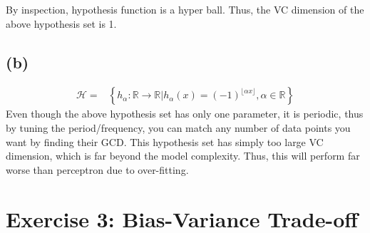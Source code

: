 \documentclass[11pt]{article}
\begin{document}
By inspection, hypothesis function is a hyper ball. Thus, the VC dimension of the above hypothesis set is 1.

\subsection*{(b)}
\begin{equation}
\begin{split}
\mathcal{H}=&\left\{h_\alpha:\mathbb{R}\rightarrow\mathbb{R}|h_\alpha(x)=(-1)^{\lfloor \alpha x\rfloor},\alpha\in\mathbb{R}\right\}
\end{split}
\end{equation}
Even though the above hypothesis set has only one parameter, it is periodic, thus by tuning the period/frequency, you can match any number of data points you want by finding their GCD.
This hypothesis set has simply too large VC dimension, which is far beyond the model complexity. Thus, this will perform far worse than perceptron due to over-fitting.

\pagebreak
\section*{Exercise 3: Bias-Variance Trade-off}
\end{document}
